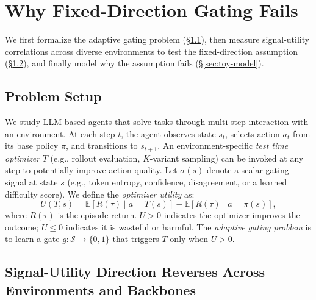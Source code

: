\section{Why Fixed-Direction Gating Fails}
\label{sec:signal-landscape}
We first formalize the adaptive gating problem (\S\ref{sec:setup}), then measure signal-utility correlations across diverse environments to test the fixed-direction assumption (\S\ref{sec:empirical-landscape}), and finally model why the assumption fails (\S\ref{sec:toy-model}).

\subsection{Problem Setup}
\label{sec:setup}
We study LLM-based agents that solve tasks through multi-step interaction with an environment. At each step $t$, the agent observes state $s_t$, selects action $a_t$ from its base policy $\pi$, and transitions to $s_{t+1}$. An environment-specific \emph{test time optimizer} $T$ (e.g., rollout evaluation, $K$-variant sampling) can be invoked at any step to potentially improve action quality. Let $\sigma(s)$ denote a scalar gating signal at state $s$ (e.g., token entropy, confidence, disagreement, or a learned difficulty score). We define the \emph{optimizer utility} as:
\begin{equation}
  U(T, s) = \mathbb{E}[R(\tau) \mid a{=}T(s)] - \mathbb{E}[R(\tau) \mid a{=}\pi(s)],
  \label{eq:utility}
\end{equation}
where $R(\tau)$ is the episode return. $U > 0$ indicates the optimizer improves the outcome; $U \leq 0$ indicates it is wasteful or harmful. The \emph{adaptive gating problem} is to learn a gate $g: \mathcal{S} \to \{0, 1\}$ that triggers $T$ only when $U > 0$.

\subsection{Signal-Utility Direction Reverses Across Environments and Backbones}
\label{sec:empirical-landscape}



